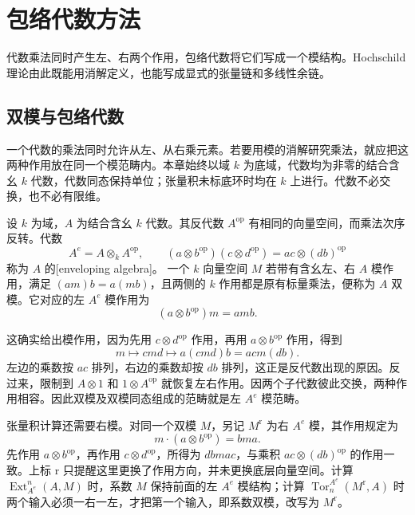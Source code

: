 
\section{包络代数方法}
\label{b4:sec:1201}

代数乘法同时产生左、右两个作用，包络代数将它们写成一个模结构。Hochschild 理论由此既能用消解定义，也能写成显式的张量链和多线性余链。

%
%

\subsection{双模与包络代数}
\label{b4:subsec:1201:01}

一个代数的乘法同时允许从左、从右乘元素。若要用模的消解研究乘法，就应把这两种作用放在同一个模范畴内。本章始终以域 \(k\) 为底域，代数均为非零的结合含幺 \(k\) 代数，代数同态保持单位；张量积未标底环时均在 \(k\) 上进行。代数不必交换，也不必有限维。

\begin{definition}\label{b4:def:enveloping-algebra}
	设 \(k\) 为域，\(A\) 为结合含幺 \(k\) 代数。其反代数 \(A^{\mathrm{op}}\) 有相同的向量空间，而乘法次序反转。代数
	\[
		A^e=A\otimes_k A^{\mathrm{op}},\qquad (a\otimes b^{\mathrm{op}})(c\otimes d^{\mathrm{op}}) =ac\otimes(db)^{\mathrm{op}}
	\]
	称为 \(A\) 的[enveloping algebra]。 一个 \(k\) 向量空间 \(M\) 若带有含幺左、右 \(A\) 模作用，满足 \((am)b=a(mb)\)，且两侧的 \(k\) 作用都是原有标量乘法，便称为 \(A\) 双模。它对应的左 \(A^e\) 模作用为
	\[
		(a\otimes b^{\mathrm{op}})m=amb.
	\]
\end{definition}

这确实给出模作用，因为先用 \(c\otimes d^{\mathrm{op}}\) 作用，再用 \(a\otimes b^{\mathrm{op}}\) 作用，得到
\[
	m\longmapsto cmd\longmapsto a(cmd)b=acm(db).
\]
左边的乘数按 \(ac\) 排列，右边的乘数却按 \(db\) 排列，这正是反代数出现的原因。反过来，限制到 \(A\otimes1\) 和 \(1\otimes A^{\mathrm{op}}\) 就恢复左右作用。因两个子代数彼此交换，两种作用相容。因此双模及双模同态组成的范畴就是左 \(A^e\) 模范畴。

\ProseParagraphBreak
张量积计算还需要右模。对同一个双模 \(M\)，另记 \(M^{\mathrm r}\) 为右 \(A^e\) 模，其作用规定为
\[
	m\cdot(a\otimes b^{\mathrm{op}})=bma.
\]
先作用 \(a\otimes b^{\mathrm{op}}\)，再作用 \(c\otimes d^{\mathrm{op}}\)，所得为 \(dbmac\)，与乘积 \(ac\otimes(db)^{\mathrm{op}}\) 的作用一致。上标 \(\mathrm r\) 只提醒这里更换了作用方向，并未更换底层向量空间。计算 \(\operatorname{Ext}_{A^e}^n(A,M)\) 时，系数 \(M\) 保持前面的左 \(A^e\) 模结构；计算 \(\operatorname{Tor}^{A^e}_n(M^{\mathrm r},A)\) 时两个输入必须一右一左，才把第一个输入，即系数双模，改写为 \(M^{\mathrm r}\)。

